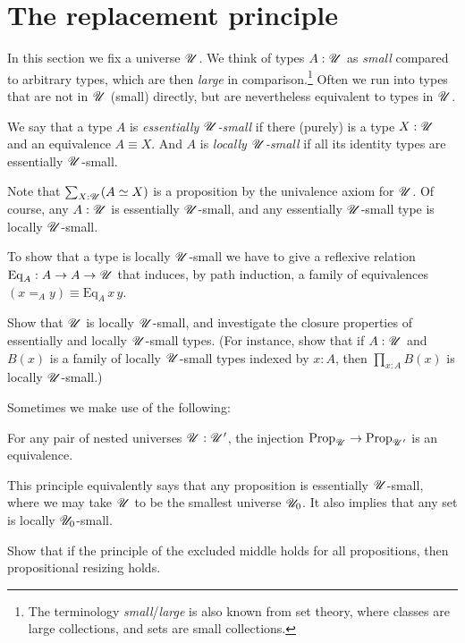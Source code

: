 \section{The replacement principle}
\label{sec:replacement}

In this section we fix a universe ${\mathscr{U}}$.
We think of types $A:{\mathscr{U}}$ as \emph{small} compared to arbitrary types,
which are then \emph{large} in comparison.\footnote{%
  The terminology \emph{small}/\emph{large} is also known from set theory,
  where classes are large collections,
  and sets are small collections.}
Often we run into types that are not in ${\mathscr{U}}$ (small) directly,
but are nevertheless equivalent to types in ${\mathscr{U}}$.
\begin{definition}\label{def:ess-loc-small}
  We say that a type $A$ is \emph{essentially ${\mathscr{U}}$-small} if there
  (purely) is a type $X:{\mathscr{U}}$ and an equivalence $A \equiv
  X$. And $A$ is \emph{locally ${\mathscr{U}}$-small} if all its identity types
  are essentially ${\mathscr{U}}$-small.
\end{definition}
Note that $\sum_{X:{\mathscr{U}}}(A \simeq X)$ is a proposition by the univalence axiom for ${\mathscr{U}}$.
Of course, any $A:{\mathscr{U}}$ is essentially ${\mathscr{U}}$-small,
and any essentially ${\mathscr{U}}$-small type is locally ${\mathscr{U}}$-small.

To show that a type is locally ${\mathscr{U}}$-small
we have to give a reflexive relation
$\mathrm{Eq}_A : A \to A \to {\mathscr{U}}$
that induces, by path induction, a family of equivalences
$(x=_Ay) \equiv \mathrm{Eq}_A\,x\,y$.

\begin{xca}
  Show that ${\mathscr{U}}$ is locally ${\mathscr{U}}$-small, and investigate
  the closure properties of essentially and locally ${\mathscr{U}}$-small types.
  (For instance, show that if $A:{\mathscr{U}}$ and $B(x)$ is a family of locally ${\mathscr{U}}$-small
  types indexed by $x:A$, then $\prod_{x:A}B(x)$ is locally ${\mathscr{U}}$-small.)
\end{xca}

Sometimes we make use of the following: %
\begin{principle}
  \label{pri:prop-resizing}
  For any pair of nested universes ${\mathscr{U}}:{\mathscr{U}}'$, the injection
  $\mathrm{Prop}_{\mathscr{U}} \to \mathrm{Prop}_{{\mathscr{U}}'}$ is an equivalence.
\end{principle}
\begin{remark}
  This principle equivalently says that any proposition is essentially ${\mathscr{U}}$-small,
  where we may take ${\mathscr{U}}$ to be the smallest universe ${\mathscr{U}}_0$.
  It also implies that any set is locally ${\mathscr{U}}_0$-small.
\end{remark}
\begin{xca}\label{xca:lem-prop-sizing}
  Show that if the principle of the excluded middle holds for all propositions,
  then propositional resizing holds.
\end{xca}

